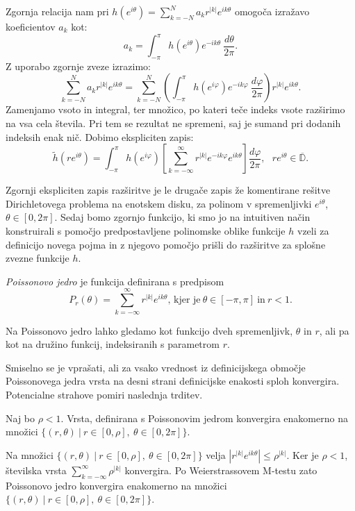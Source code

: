 \documentclass[mat1]{fmfdelo}
\begin{document}
        Zgornja relacija nam pri $h(e^{i\theta}) = \sum_{k = -N}^{N}{a_k r^{|k|} e^{ik\theta}}$ omogoča izražavo koeficientov $a_k$ kot:
        $$
            a_ k = \int_{-\pi}^{\pi}{h \left(e^{i\theta}\right)e^{-ik\theta}~\frac{d\theta}{2\pi}}.
        $$
    Z uporabo zgornje zveze izrazimo:
    $$
        \sum_{k = - N}^{N}{ a_k r^{|k|}e^{ik\theta}} = \sum_{k = - N}^{N} \left(\int_{-\pi}^{\pi}{h(e^{i \varphi}) e^{- i k \varphi}~\frac{d \varphi}{2 \pi}}\right) r^{|k|} e^{i k \theta}.
    $$
    Zamenjamo vsoto in integral, ter množico, po kateri teče indeks vsote razširimo na vsa cela števila. Pri tem se rezultat ne spremeni, saj je sumand pri dodanih indeksih enak nič. Dobimo ekspliciten zapis:
    \begin{equation}
        \label{int1}
        \widetilde{h}(r e^{i \theta}) = \int_{-\pi}^{\pi}{h(e^{i \varphi}) \left[\sum_{k = - \infty}^{\infty} r^{|k|} e^{- i k \varphi} e^{i k \theta} \right] \frac{d \varphi}{2 \pi}}, ~~~ r e^{i\theta} \in \overline{\mathbb{D}}.
    \end{equation}

    Zgornji ekspliciten zapis razširitve je le drugače zapis že komentirane rešitve Dirichletovega problema na enotskem disku, za polinom v spremenljivki $e^{i \theta}$, $\theta \in [0,2\pi]$.
    Sedaj bomo zgornjo funkcijo, ki smo jo na intuitiven način konstruirali s pomočjo predpostavljene polinomske oblike funkcije $h$ vzeli za definicijo novega pojma in z njegovo pomočjo prišli do razširitve za splošne zvezne funkcije $h$.
    \begin{definicija}
        \emph{Poissonovo jedro} je funkcija definirana s predpisom
        $$
           P_r(\theta) = \sum_{k = -\infty}^{\infty}{r^{|k|} e^{i k \theta}}\text{, kjer je}~\theta \in [-\pi, \pi]~\text{in}~ r < 1.
        $$
    \end{definicija}
    \begin{opomba}
        Na Poissonovo jedro lahko gledamo kot funkcijo dveh spremenljivk, $\theta$ in $r$, ali pa kot na družino funkcij, indeksiranih s parametrom $r$.
    \end{opomba}

    Smiselno se je vprašati, ali za vsako vrednost iz definicijskega območje Poissonovega jedra vrsta na desni strani definicijske enakosti sploh konvergira. Potencialne strahove pomiri naslednja trditev.
    
    \begin{trditev}
        Naj bo $\rho < 1$. Vrsta, definirana s Poissonovim jedrom konvergira enakomerno na množici $\{(r,\theta)~|~r \in [0,\rho],~ \theta \in [0,2\pi]\}$.
    \end{trditev}
    \begin{dokaz}
        Na množici $\{(r,\theta)~|~r \in [0,\rho],~ \theta \in [0,2\pi]\}$ velja $|r^{|k|} e^{i k \theta}| \leq \rho^{|k|}$. Ker je $\rho < 1$, številska vrsta $\sum_{k = -\infty}^{\infty}{\rho ^{|k|}}$ konvergira. 
        Po Weierstrassovem M-testu zato Poissonovo jedro konvergira enakomerno na množici $\{(r,\theta)~|~r \in [0,\rho],~ \theta \in [0,2\pi]\}$.
    \end{dokaz}
\end{document}

